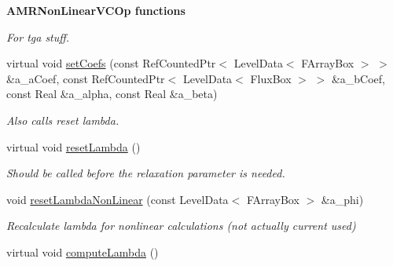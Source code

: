 \begin{Indent}{\bf A\-M\-R\-Non\-Linear\-V\-C\-Op functions}
\begin{DoxyCompactItemize}
\begin{DoxyCompactList}\small\item\em For tga stuff. \end{DoxyCompactList}\item 
\hypertarget{class_a_m_r_non_linear_v_c_op_a1f3457e488c5186bd90b34934a0ce02d}{virtual void \hyperlink{class_a_m_r_non_linear_v_c_op_a1f3457e488c5186bd90b34934a0ce02d}{set\-Coefs} (const Ref\-Counted\-Ptr$<$ Level\-Data$<$ F\-Array\-Box $>$ $>$ \&a\-\_\-a\-Coef, const Ref\-Counted\-Ptr$<$ Level\-Data$<$ Flux\-Box $>$ $>$ \&a\-\_\-b\-Coef, const Real \&a\-\_\-alpha, const Real \&a\-\_\-beta)}\label{class_a_m_r_non_linear_v_c_op_a1f3457e488c5186bd90b34934a0ce02d}

\begin{DoxyCompactList}\small\item\em Also calls reset lambda. \end{DoxyCompactList}\item 
\hypertarget{class_a_m_r_non_linear_v_c_op_add4e1fcde22b295a038e786cf0c1152a}{virtual void \hyperlink{class_a_m_r_non_linear_v_c_op_add4e1fcde22b295a038e786cf0c1152a}{reset\-Lambda} ()}\label{class_a_m_r_non_linear_v_c_op_add4e1fcde22b295a038e786cf0c1152a}

\begin{DoxyCompactList}\small\item\em Should be called before the relaxation parameter is needed. \end{DoxyCompactList}\item 
\hypertarget{class_a_m_r_non_linear_v_c_op_a5402fd312e465c8b1d07357987d66085}{void \hyperlink{class_a_m_r_non_linear_v_c_op_a5402fd312e465c8b1d07357987d66085}{reset\-Lambda\-Non\-Linear} (const Level\-Data$<$ F\-Array\-Box $>$ \&a\-\_\-phi)}\label{class_a_m_r_non_linear_v_c_op_a5402fd312e465c8b1d07357987d66085}

\begin{DoxyCompactList}\small\item\em Recalculate lambda for nonlinear calculations (not actually current used) \end{DoxyCompactList}\item 
\hypertarget{class_a_m_r_non_linear_v_c_op_a17172466afb18a9c19b568b03b96c7dc}{virtual void \hyperlink{class_a_m_r_non_linear_v_c_op_a17172466afb18a9c19b568b03b96c7dc}{compute\-Lambda} ()}\label{class_a_m_r_non_linear_v_c_op_a17172466afb18a9c19b568b03b96c7dc}


\end{DoxyCompactItemize}
\end{Indent}
